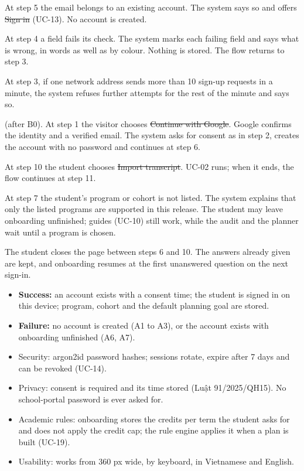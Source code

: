 \begin{altflows}
  \item[A1. Email already registered.] At step 5 the email belongs to an existing account. The system says so and offers
        \st{Sign in} (UC-13). No account is created.
  \item[A2. Invalid input.] At step 4 a field fails its check. The system marks each failing field and says what is wrong,
        in words as well as by colour. Nothing is stored. The flow returns to step 3.
  \item[A3. Too many attempts.] At step 3, if one network address sends more than 10 sign-up requests in a minute, the
        system refuses further attempts for the rest of the minute and says so.
  \item[A4. Sign up with Google] (after B0). At step 1 the visitor chooses \st{Continue with Google}. Google confirms the
        identity and a verified email. The system asks for consent as in step 2, creates the account with no password and
        continues at step 6.
  \item[A5. Import the transcript now.] At step 10 the student chooses \st{Import transcript}. UC-02 runs; when it ends,
        the flow continues at step 11.
  \item[A6. Program not offered yet.] At step 7 the student's program or cohort is not listed. The system explains that only
        the listed programs are supported in this release. The student may leave onboarding unfinished; guides (UC-10)
        still work, while the audit and the planner wait until a program is chosen.
  \item[A7. Onboarding interrupted.] The student closes the page between steps 6 and 10. The answers already given are
        kept, and onboarding resumes at the first unanswered question on the next sign-in.
\end{altflows}

\begin{itemize}
  \item \textbf{Success:} an account exists with a consent time; the student is signed in on this device; program, cohort
        and the default planning goal are stored.
  \item \textbf{Failure:} no account is created (A1 to A3), or the account exists with onboarding unfinished (A6, A7).
\end{itemize}

\begin{itemize}
  \item Security: argon2id password hashes; sessions rotate, expire after 7 days and can be revoked (UC-14).
  \item Privacy: consent is required and its time stored (Luật 91/2025/QH15). No school-portal password is ever asked for.
  \item Academic rules: onboarding stores the credits per term the student asks for and does not apply the credit cap; the
        rule engine applies it when a plan is built (UC-19).
  \item Usability: works from 360 px wide, by keyboard, in Vietnamese and English.
\end{itemize}

